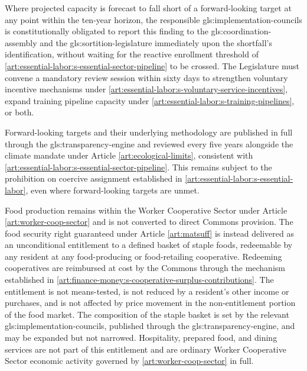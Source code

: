 Where projected capacity is forecast to fall short of a forward-looking target at any point within the ten-year horizon, the responsible \gls{gls:implementation-councils} is constitutionally obligated to report this finding to the \gls{gls:coordination-assembly} and the \gls{gls:sortition-legislature} immediately upon the shortfall's identification, without waiting for the reactive enrollment threshold of \ref{art:essential-labor:s-essential-sector-pipeline} to be crossed. The Legislature must convene a mandatory review session within sixty days to strengthen voluntary incentive mechanisms under \ref{art:essential-labor:s-voluntary-service-incentives}, expand training pipeline capacity under \ref{art:essential-labor:s-training-pipelines}, or both.

Forward-looking targets and their underlying methodology are published in full through the \gls{gls:transparency-engine} and reviewed every five years alongside the climate mandate under Article \ref{art:ecological-limits}, consistent with \ref{art:essential-labor:s-essential-sector-pipeline}. This remains subject to the prohibition on coercive assignment established in \ref{art:essential-labor:s-essential-labor}, even where forward-looking targets are unmet.

Food production remains within the Worker Cooperative Sector under Article \ref{art:worker-coop-sector} and is not converted to direct Commons provision. The food security right guaranteed under Article \ref{art:matsuff} is instead delivered as an unconditional entitlement to a defined basket of staple foods, redeemable by any resident at any food-producing or food-retailing cooperative. Redeeming cooperatives are reimbursed at cost by the Commons through the mechanism established in \ref{art:finance-money:s-cooperative-surplus-contributions}. The entitlement is not means-tested, is not reduced by a resident's other income or purchases, and is not affected by price movement in the non-entitlement portion of the food market. The composition of the staple basket is set by the relevant \gls{gls:implementation-councils}, published through the \gls{gls:transparency-engine}, and may be expanded but not narrowed. Hospitality, prepared food, and dining services are not part of this entitlement and are ordinary Worker Cooperative Sector economic activity governed by \ref{art:worker-coop-sector} in full.

